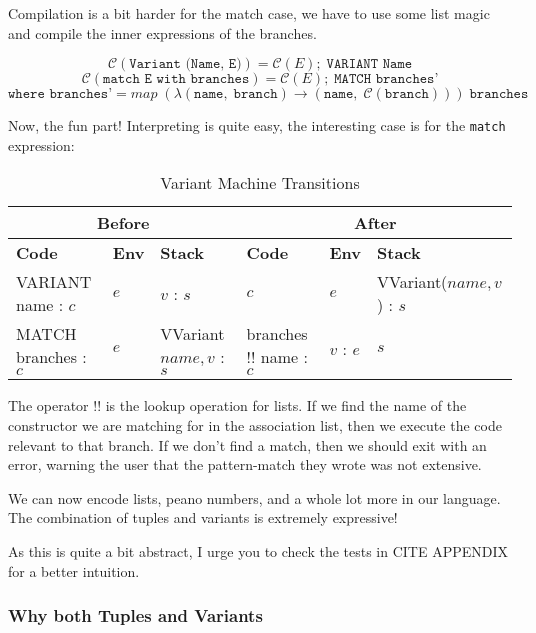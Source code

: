 Compilation is a bit harder for the match case, 
we have to use some list magic and compile the inner expressions of the branches.

\[ \mathcal{C}(\texttt{Variant (Name, E)}) = \mathcal{C}(E);\; \texttt{VARIANT Name} \]
\[ \mathcal{C}(\texttt{match E with branches}) = \mathcal{C}(E);\; \texttt{MATCH branches'} \]
\[  \texttt{where branches'} = map\; (\lambda (\texttt{name},\; \texttt{branch}) \to (\texttt{name},\; \mathcal{C}(\texttt{branch})))\; \texttt{branches} \]

Now, the fun part! Interpreting is quite easy, the interesting case is for the \texttt{match} expression:

\begin{table}[h]
    \centering
    \footnotesize
    \begin{tabular}{|l|l|l||l|l|l|}
        \hline
        \multicolumn{3}{|c||}{\textbf{Before}} & \multicolumn{3}{c|}{\textbf{After}} \\
        \hline
        \textbf{Code} & \textbf{Env} & \textbf{Stack} & \textbf{Code} & \textbf{Env} & \textbf{Stack} \\
        \hline
        VARIANT name : \(c\) & \( e \) & \( v \) : \( s \) & \( c \) & \( e \) & VVariant(\( name, v \)) : \( s \) \\
        MATCH branches : \(c\) & \( e \) & VVariant \( name, v \) : \( s \) & branches \( !! \) name : \( c \) & \( v \) : \( e \) & \( s \) \\
        \hline
    \end{tabular}
    \caption{Variant Machine Transitions}
\end{table}

The operator \( !! \) is the lookup operation for lists. If we find the name of the constructor 
we are matching for in the association list, then we execute the code relevant to that branch.
If we don't find a match, then we should exit with an error, warning the user that the pattern-match they wrote was 
not extensive.

We can now encode lists, peano numbers, and a whole lot more in our language. The combination of tuples and variants
is extremely expressive!

As this is quite a bit abstract, I urge you to check the tests in CITE APPENDIX for a better intuition.

\subsubsection{Why both Tuples and Variants}

